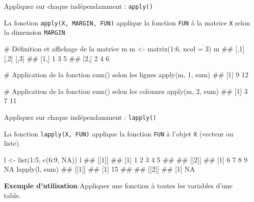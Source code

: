 \documentclass[12pt,handout,ignorenonframetext,]{beamer}
\newenvironment{Shaded}{}{}
\newcommand{\KeywordTok}[1]{\textcolor[rgb]{0.00,0.00,1.00}{{#1}}}
\newcommand{\DataTypeTok}[1]{{#1}}
\newcommand{\DecValTok}[1]{{#1}}
\newcommand{\StringTok}[1]{\textcolor[rgb]{0.00,0.50,0.50}{{#1}}}
\newcommand{\CommentTok}[1]{\textcolor[rgb]{0.00,0.50,0.00}{{#1}}}
\newcommand{\OtherTok}[1]{\textcolor[rgb]{1.00,0.25,0.00}{{#1}}}
\newcommand{\NormalTok}[1]{{#1}}
\renewenvironment{Shaded}{\begin{snugshade}}{\end{snugshade}}
\begin{document}
\begin{frame}[fragile]{\large Appliquer sur chaque indépendamment :
\texttt{apply()}}

La fonction \texttt{apply(X,\ MARGIN,\ FUN)} applique la fonction
\texttt{FUN} à la matrice \texttt{X} selon la dimension \texttt{MARGIN}.

\pause \footnotesize

\begin{Shaded}
\begin{Highlighting}[]
\CommentTok{# Définition et affichage de la matrice m}
\NormalTok{m <-}\StringTok{ }\KeywordTok{matrix}\NormalTok{(}\DecValTok{1}\NormalTok{:}\DecValTok{6}\NormalTok{, }\DataTypeTok{ncol =} \DecValTok{3}\NormalTok{)}
\NormalTok{m}
  \NormalTok{##      [,1] [,2] [,3]}
  \NormalTok{## [1,]    1    3    5}
  \NormalTok{## [2,]    2    4    6}

\CommentTok{# Application de la fonction sum() selon les lignes}
\KeywordTok{apply}\NormalTok{(m, }\DecValTok{1}\NormalTok{, sum)}
  \NormalTok{## [1]  9 12}

\CommentTok{# Application de la fonction sum() selon les colonnes}
\KeywordTok{apply}\NormalTok{(m, }\DecValTok{2}\NormalTok{, sum)}
  \NormalTok{## [1]  3  7 11}
\end{Highlighting}
\end{Shaded}

\end{frame}

\begin{frame}[fragile]{\large Appliquer sur chaque indépendamment :
\texttt{lapply()}}

\small
La fonction \texttt{lapply(X,\ FUN)} applique la fonction \texttt{FUN} à
l'objet \texttt{X} (vecteur ou liste).

\pause \footnotesize

\begin{Shaded}
\begin{Highlighting}[]
\NormalTok{l <-}\StringTok{ }\KeywordTok{list}\NormalTok{(}\DecValTok{1}\NormalTok{:}\DecValTok{5}\NormalTok{, }\KeywordTok{c}\NormalTok{(}\DecValTok{6}\NormalTok{:}\DecValTok{9}\NormalTok{, }\OtherTok{NA}\NormalTok{))}
\NormalTok{l}
  \NormalTok{## [[1]]}
  \NormalTok{## [1] 1 2 3 4 5}
  \NormalTok{## }
  \NormalTok{## [[2]]}
  \NormalTok{## [1]  6  7  8  9 NA}
\KeywordTok{lapply}\NormalTok{(l, sum)}
  \NormalTok{## [[1]]}
  \NormalTok{## [1] 15}
  \NormalTok{## }
  \NormalTok{## [[2]]}
  \NormalTok{## [1] NA}
\end{Highlighting}
\end{Shaded}

\pause \small \vspace{-0.2cm}

\textbf{Exemple d'utilisation} Appliquer une fonction à toutes les
variables d'une table.

\end{frame}
\end{document}
